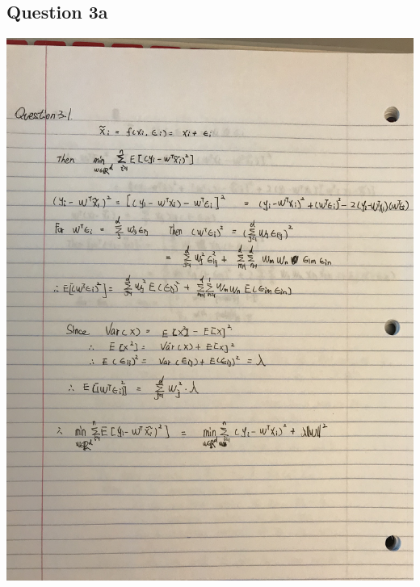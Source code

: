 \documentclass[11pt]{article} %
\begin{document}
\subsection{Question 3a}
\includegraphics[scale = 0.15]{e31.jpeg}\\
\end{document}
